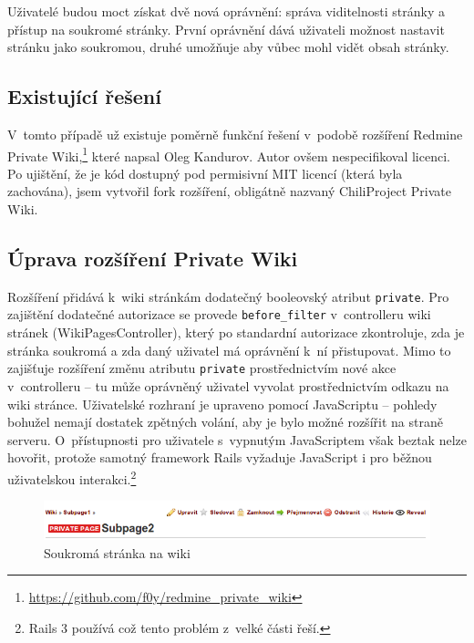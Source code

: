 \documentclass[thesis=B,czech]{FITthesis}[2012/05/02]
\begin{document}
Uživatelé budou moct získat dvě nová oprávnění: správa viditelnosti
stránky a přístup na soukromé stránky. První oprávnění dává uživateli
možnost nastavit stránku jako soukromou, druhé umožňuje aby vůbec mohl
vidět obsah stránky.

\subsection{Existující řešení}

V~tomto případě už existuje poměrně funkční řešení v~podobě rozšíření
Redmine Private Wiki,\footnote{\url{https://github.com/f0y/redmine_private_wiki}}
které napsal Oleg Kandurov. Autor ovšem nespecifikoval licenci. Po
ujištění, že je kód dostupný pod permisivní MIT licencí (která byla
zachována), jsem vytvořil \gls{fork} rozšíření, obligátně nazvaný
ChiliProject Private Wiki.

\subsection{Úprava rozšíření Private Wiki}

Rozšíření přidává k~wiki stránkám dodatečný booleovský atribut
\lstinline!private!. Pro zajištění dodatečné autorizace se provede
\lstinline!before_filter! v~controlleru wiki stránek
(WikiPagesController), který po standardní autorizace zkontroluje, zda je
stránka soukromá a zda daný uživatel má oprávnění k~ní přistupovat. Mimo
to zajišťuje rozšíření změnu atributu \lstinline!private!
prostřednictvím nové akce v~controlleru -- tu může oprávněný uživatel
vyvolat prostřednictvím odkazu na wiki stránce. Uživatelské rozhraní je
upraveno pomocí JavaScriptu -- pohledy bohužel nemají dostatek zpětných
volání, aby je bylo možné rozšířit na straně serveru. O~přístupnosti pro
uživatele s~vypnutým JavaScriptem však beztak nelze hovořit, protože
samotný framework Rails vyžaduje JavaScript i pro běžnou uživatelskou
interakci.\footnote{Rails 3 používá 
  což tento problém z~velké části řeší.}

\begin{figure}[tbp]
\centering
\centerline{\includegraphics[width=1.2\textwidth]{wiki-gui1.png}}
\caption{Soukromá stránka na wiki}
\label{fig:GUIPrivateWiki}
\end{figure}
\end{document}
